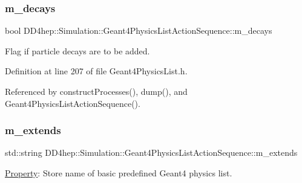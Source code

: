 \hypertarget{class_d_d4hep_1_1_simulation_1_1_geant4_physics_list_action_sequence_a92b7972cbc8ee15f7213d68609121b4e}{}\label{class_d_d4hep_1_1_simulation_1_1_geant4_physics_list_action_sequence_a92b7972cbc8ee15f7213d68609121b4e} 
\subsubsection{\texorpdfstring{m\+\_\+decays}{m\_decays}}
{\footnotesize\ttfamily bool D\+D4hep\+::\+Simulation\+::\+Geant4\+Physics\+List\+Action\+Sequence\+::m\+\_\+decays}



Flag if particle decays are to be added. 



Definition at line 207 of file Geant4\+Physics\+List.\+h.



Referenced by construct\+Processes(), dump(), and Geant4\+Physics\+List\+Action\+Sequence().

\hypertarget{class_d_d4hep_1_1_simulation_1_1_geant4_physics_list_action_sequence_a0231a66223374c98dd4d0763893e8cad}{}\label{class_d_d4hep_1_1_simulation_1_1_geant4_physics_list_action_sequence_a0231a66223374c98dd4d0763893e8cad} 
\subsubsection{\texorpdfstring{m\+\_\+extends}{m\_extends}}
{\footnotesize\ttfamily std\+::string D\+D4hep\+::\+Simulation\+::\+Geant4\+Physics\+List\+Action\+Sequence\+::m\+\_\+extends}



\hyperlink{class_d_d4hep_1_1_property}{Property}\+: Store name of basic predefined Geant4 physics list. 



